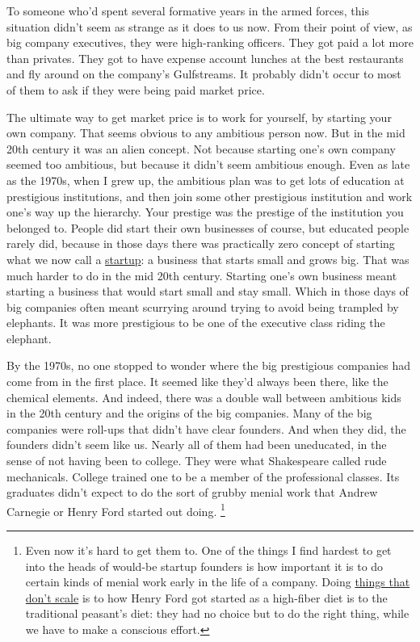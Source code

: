 \documentclass[12pt]{book}
\begin{document}
To someone who'd spent several formative years in the armed forces, this
situation didn't seem as strange as it does to us now. From their point
of view, as big company executives, they were high-ranking officers.
They got paid a lot more than privates. They got to have expense account
lunches at the best restaurants and fly around on the company's
Gulfstreams. It probably didn't occur to most of them to ask if they
were being paid market price.

The ultimate way to get market price is to work for yourself, by
starting your own company. That seems obvious to any ambitious person
now. But in the mid 20th century it was an alien concept. Not because
starting one's own company seemed too ambitious, but because it didn't
seem ambitious enough. Even as late as the 1970s, when I grew up, the
ambitious plan was to get lots of education at prestigious institutions,
and then join some other prestigious institution and work one's way up
the hierarchy. Your prestige was the prestige of the institution you
belonged to. People did start their own businesses of course, but
educated people rarely did, because in those days there was practically
zero concept of starting what we now call a \href{growth.html}{startup}:
a business that starts small and grows big. That was much harder to do
in the mid 20th century. Starting one's own business meant starting a
business that would start small and stay small. Which in those days of
big companies often meant scurrying around trying to avoid being
trampled by elephants. It was more prestigious to be one of the
executive class riding the elephant.

By the 1970s, no one stopped to wonder where the big prestigious
companies had come from in the first place. It seemed like they'd always
been there, like the chemical elements. And indeed, there was a double
wall between ambitious kids in the 20th century and the origins of the
big companies. Many of the big companies were roll-ups that didn't have
clear founders. And when they did, the founders didn't seem like us.
Nearly all of them had been uneducated, in the sense of not having been
to college. They were what Shakespeare called rude mechanicals. College
trained one to be a member of the professional classes. Its graduates
didn't expect to do the sort of grubby menial work that Andrew Carnegie
or Henry Ford started out doing. \footnote{Even now it's hard to get them to. One of the things I find
hardest to get into the heads of would-be startup founders is how
important it is to do certain kinds of menial work early in the life of
a company. Doing \href{ds.html}{things that don't scale} is to how Henry
Ford got started as a high-fiber diet is to the traditional peasant's
diet: they had no choice but to do the right thing, while we have to
make a conscious effort.}
\end{document}
